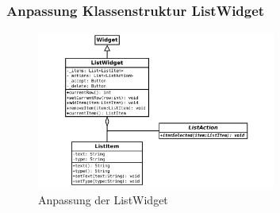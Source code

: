 %
%
%
\begin{frame}
	\frametitle{Anpassung Klassenstruktur ListWidget}
%
	\begin{figure}
		\centering
		\includegraphics[width = 0.7\textwidth]{../grafiken/uml-list-widget-2}
		\caption{Anpassung der ListWidget}
	\end{figure}
\end{frame}
